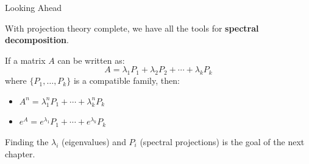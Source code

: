 \documentclass[10pt]{beamer}
\theoremstyle{definition}
\newcommand{\x}[1]{\alert{\textbf{#1}}}
\begin{document}
\begin{frame}{Looking Ahead}

With projection theory complete, we have all the tools for \x{spectral decomposition}.

\vspace{0.5em}

If a matrix $A$ can be written as:
$$A = \lambda_1 P_1 + \lambda_2 P_2 + \cdots + \lambda_k P_k$$
where $\{P_1, \ldots, P_k\}$ is a compatible family, then:

\vspace{0.3em}

\begin{itemize}
\item $A^n = \lambda_1^n P_1 + \cdots + \lambda_k^n P_k$
\item $e^A = e^{\lambda_1} P_1 + \cdots + e^{\lambda_k} P_k$
\end{itemize}

\vspace{0.5em}

Finding the $\lambda_i$ (eigenvalues) and $P_i$ (spectral projections) is the goal of the next chapter.

\end{frame}
\end{document}
